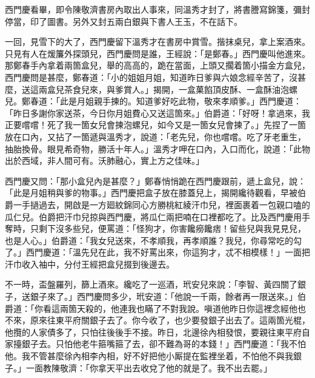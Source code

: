 西門慶看畢，即令陳敬濟書房內取出人事來，同溫秀才封了，將書謄寫錦箋，彌封停當，印了圖書。另外又封五兩白銀與下書人王玉，不在話下。

一回，見雪下的大了，西門慶留下溫秀才在書房中賞雪。揩抹桌兒，拿上案酒來。只見有人在煖簾外探頭兒，西門慶問是誰，王經說：「是鄭春。」西門慶叫他進來。那鄭春手內拿着兩箇盒兒，舉的高高的，跪在當面，上頭又擱着箇小描金方盒兒，西門慶問是甚麼，鄭春道：「小的姐姐月姐，知道昨日爹與六娘念經辛苦了，沒甚麼，送這兩盒兒茶食兒來，與爹賞人。」揭開，一盒菓餡頂皮酥、一盒酥油泡螺兒。鄭春道：「此是月姐親手揀的。知道爹好吃此物，敬來孝順爹。」西門慶道：「昨日多謝你家送茶，今日你月姐費心又送這箇來。」伯爵道：「好呀！拿過來，我正要嚐嚐！死了我一箇女兒會揀泡螺兒，如今又是一箇女兒會揀了。」先捏了一箇放在口內，又拈了一箇遞與溫秀才，說道：「老先兒，你也嚐嚐。吃了牙老重生，抽胎換骨。眼見希奇物，勝活十年人。」{}溫秀才呷在口內，入口而化，說道：「此物出於西域，非人間可有。沃肺融心，實上方之佳味。」

西門慶又問：「那小盒兒內是甚麼？」鄭春悄悄跪在西門慶跟前，遞上盒兒，說：「此是月姐稍與爹的物事。」西門慶把盒子放在膝蓋兒上，揭開纔待觀看，早被伯爵一手撾過去，開啟是一方廻紋錦同心方勝桃紅綾汗巾兒，裡面裹着一包親口嗑的瓜仁兒。伯爵把汗巾兒掠與西門慶，將瓜仁兩把喃在口裡都吃了。比及西門慶用手奪時，只剩下沒多些兒，{}便罵道：「怪狗才，你害饞癆饞痞！留些兒與我見見兒，也是人心。」伯爵道：「我女兒送來，不孝順我，再孝順誰？我兒，你尋常吃的勾了。」{}西門慶道：「溫先兒在此，我不好罵出來，你這狗才，忒不相模樣！」一面把汗巾收入袖中，分付王經把盒兒掇到後邊去。

不一時，盃盤羅列，篩上酒來。纔吃了一巡酒，玳安兒來說：「李智、黃四關了銀子，送銀子來了。」西門慶問多少，玳安道：「他說一千兩，餘者再一限送來。」伯爵道：「你看這兩箇天殺的，他連我也瞞了不對我說。嗔道他昨日你這裡念經他也不來，原來往東平府關銀子去了。你今收了，也少要發銀子出去了。這兩箇光棍，他攬的人家債多了，只怕往後後手不接。昨日，北邊徐內相發恨，要親往東平府自家擡銀子去。只怕他老牛箍嘴箍了去，卻不難為哥的本錢！」{}西門慶道：「我不怕他。我不管甚麼徐內相李內相，好不好把他小厮提在監裡坐着，不怕他不與我銀子。」一面教陳敬濟：「你拿天平出去收兌了他的就是了。我不出去罷。」


